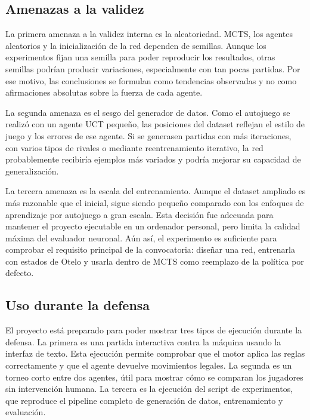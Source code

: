 \documentclass[conference,a4paper]{IEEEtran}
\begin{document}
\subsection{Amenazas a la validez}

La primera amenaza a la validez interna es la aleatoriedad. MCTS, los agentes
aleatorios y la inicialización de la red dependen de semillas. Aunque los
experimentos fijan una semilla para poder reproducir los resultados, otras
semillas podrían producir variaciones, especialmente con tan pocas partidas. Por
ese motivo, las conclusiones se formulan como tendencias observadas y no como
afirmaciones absolutas sobre la fuerza de cada agente.

La segunda amenaza es el sesgo del generador de datos. Como el autojuego se
realizó con un agente UCT pequeño, las posiciones del dataset reflejan el estilo
de juego y los errores de ese agente. Si se generasen partidas con más
iteraciones, con varios tipos de rivales o mediante reentrenamiento iterativo,
la red probablemente recibiría ejemplos más variados y podría mejorar su
capacidad de generalización.

La tercera amenaza es la escala del entrenamiento. Aunque el dataset ampliado es
más razonable que el inicial, sigue siendo pequeño comparado con los enfoques de
aprendizaje por autojuego a gran escala. Esta decisión fue adecuada para mantener
el proyecto ejecutable en un ordenador personal, pero limita la calidad máxima
del evaluador neuronal. Aún así, el experimento es suficiente para comprobar el
requisito principal de la convocatoria: diseñar una red, entrenarla con estados
de Otelo y usarla dentro de MCTS como reemplazo de la política por defecto.

\subsection{Uso durante la defensa}

El proyecto está preparado para poder mostrar tres tipos de ejecución durante la
defensa. La primera es una partida interactiva contra la máquina usando la
interfaz de texto. Esta ejecución permite comprobar que el motor aplica las
reglas correctamente y que el agente devuelve movimientos legales. La segunda es
un torneo corto entre dos agentes, útil para mostrar cómo se comparan los
jugadores sin intervención humana. La tercera es la ejecución del script de
experimentos, que reproduce el pipeline completo de generación de datos,
entrenamiento y evaluación.
\end{document}
